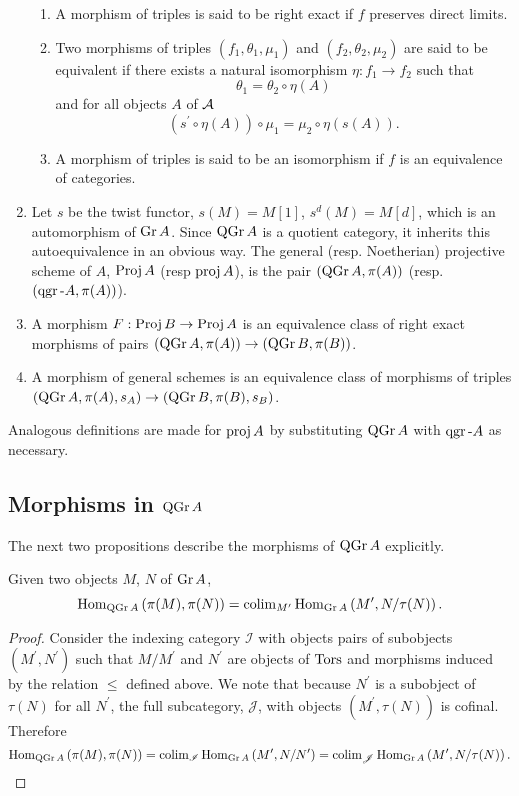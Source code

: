 \documentclass[dissertation.tex]{subfiles}
\begin{document}
\begin{defn}
\begin{enumerate}
    \begin{enumerate}
    \item
      A morphism of triples is said to be right exact if $f$ preserves direct limits.
    \item
      Two morphisms of triples $(f_1, \theta_1, \mu_1)$ and $(f_2, \theta_2, \mu_2)$ are said to be equivalent if there exists a natural isomorphism $\eta : f_1 \rightarrow f_2$ such that
      $$\theta_1 = \theta_2 \circ \eta(A)$$
      and for all objects $A$ of $\mathcal{A}$
      $$(s^\prime \circ \eta(A)) \circ \mu_1 = \mu_2 \circ \eta(s(A)).$$
    \item
      A morphism of triples is said to be an isomorphism if $f$ is an equivalence of categories.
    \end{enumerate}
  \item
    Let $s$ be the twist functor, $s(M) = M[1]$, $s^d(M) = M[d]$, which is an automorphism of $\operatorname{Gr}A$.
    Since $\operatorname{QGr}A$ is a quotient category, it inherits this autoequivalence in an obvious way.
    The general (resp. Noetherian) projective scheme of $A$, $\operatorname{Proj} A$ (resp $\operatorname{proj} A$), is the pair $(\operatorname{QGr}A, \pi(A))$ (resp. $(\operatorname{qgr}\text{-}A, \pi(A))$).
  \item
    A morphism $F :\operatorname{Proj} B \rightarrow \operatorname{Proj} A$ is an equivalence class of right exact morphisms of pairs $(\operatorname{QGr}A, \pi(A)) \rightarrow (\operatorname{QGr}B, \pi(B))$.
  \item
    A morphism of general schemes is an equivalence class of morphisms of triples $(\operatorname{QGr}A, \pi(A), s_A) \rightarrow (\operatorname{QGr}B, \pi(B), s_B)$.
  \end{enumerate}
  Analogous definitions are made for $\operatorname{proj} A$ by substituting $\operatorname{QGr}A$ with $\operatorname{qgr}\text{-}A$ as necessary.
\end{defn}

\subsection{Morphisms in $\operatorname{QGr}A$}
The next two propositions describe the morphisms of $\operatorname{QGr}A$ explicitly.

\begin{prop}
  Given two objects $M$, $N$ of $\operatorname{Gr}A$, 
  $$\operatorname{Hom}_{\operatorname{QGr}A}\left(\pi(M), \pi(N)\right) = \operatorname{colim}_{M^\prime}\operatorname{Hom}_{\operatorname{Gr}A}\left(M^\prime, N/\tau(N)\right).$$
  
  \begin{proof}
    Consider the indexing category $\mathscr{I}$ with objects pairs of subobjects $(M^\prime, N^\prime)$ such that $M/M^\prime$ and $N^\prime$ are objects of $\Tors$ and morphisms induced by the relation $\leq$ defined above.
    We note that because $N^\prime$ is a subobject of $\tau(N)$ for all $N^\prime$, the full subcategory, $\mathscr{J}$, with objects $(M^\prime, \tau(N))$ is cofinal.
    Therefore
    $$\operatorname{Hom}_{\operatorname{QGr}A}\left(\pi(M), \pi(N)\right) = \operatorname{colim}_{\mathscr{I}}\operatorname{Hom}_{\operatorname{Gr}A}\left(M^\prime, N/N^\prime\right) = \operatorname{colim}_{\mathscr{J}}\operatorname{Hom}_{\operatorname{Gr}A}\left(M^\prime, N/\tau(N)\right).$$
  \end{proof}
\end{prop}
\end{document}
